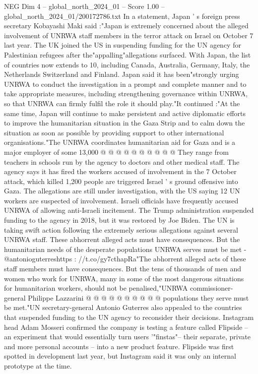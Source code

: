 \begin{textsample}{NEG Dim 4 – global\_north\_2024\_01 – Score 1.00 – global\_north\_2024\_01/200172786.txt}  \label{ex:f4_neg_113}
In a statement, Japan ' s foreign press secretary Kobayashi Maki said :"Japan is extremely concerned about the alleged involvement of UNRWA staff members in the terror attack on Israel on October 7 last year.
The UK joined the US in suspending funding for the UN agency for Palestinian refugees after the"appalling"allegations surfaced.
With Japan, the list of countries now extends to 10, including Canada, Australia, Germany, Italy, the Netherlands Switzerland and Finland.
Japan said it has been"strongly urging UNRWA to conduct the investigation in a prompt and complete manner and to take appropriate measures, including strengthening governance within UNRWA, so that UNRWA can firmly fulfil the role it should play."It continued :"At the same time, Japan will continue to make persistent and active diplomatic efforts to improve the humanitarian situation in the Gaza Strip and to calm down the situation as soon as possible by providing support to other international organisations."The UNRWA coordinates humanitarian aid for Gaza and is a major employer of some 13,000 @ @ @ @ @ @ @ @ @ @ They range from teachers in schools run by the agency to doctors and other medical staff.
The agency says it has fired the workers accused of involvement in the 7 October attack, which killed 1,200 people are triggered Israel ' s ground offensive into Gaza.
The allegations are still under investigation, with the US saying 12 UN workers are suspected of involvement.
Israeli officials have frequently accused UNRWA of allowing anti-Israeli incitement.
The Trump administration suspended funding to the agency in 2018, but it was restored by Joe Biden.
The UN is taking swift action following the extremely serious allegations against several UNRWA staff.
These abhorrent alleged acts must have consequences.
But the humanitarian needs of the desperate populations UNRWA serves must be met - @antonioguterreshttps : //t.co/gy7cthapRa"The abhorrent alleged acts of these staff members must have consequences.
But the tens of thousands of men and women who work for UNRWA, many in some of the most dangerous situations for humanitarian workers, should not be penalised,"UNRWA commissioner-general Philippe Lazzarini @ @ @ @ @ @ @ @ @ @ populations they serve must be met."UN secretary-general Antonio Guterres also appealed to the countries that suspended funding to the UN agency to reconsider their decisions.
Instagram head Adam Mosseri confirmed the company is testing a feature called Flipside -- an experiment that would essentially turn users '"finstas"-- their separate, private and more personal accounts -- into a new product feature.
Flipside was first spotted in development last year, but Instagram said it was only an internal prototype at the time.

\end{textsample}
